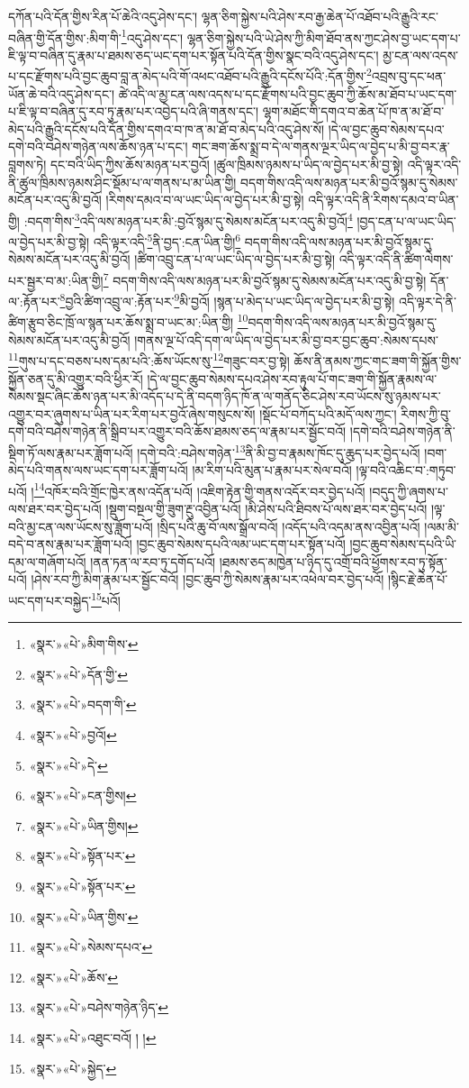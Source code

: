 དཀོན་པའི་དོན་གྱིས་རིན་པོ་ཆེའི་འདུ་ཤེས་དང་། ལྷན་ཅིག་སྐྱེས་པའི་ཤེས་རབ་རྒྱ་ཆེན་པོ་འཐོབ་པའི་རྒྱུའི་རང་བཞིན་གྱི་དོན་གྱིས་:མིག་གི་\footnote{«སྣར་»«པེ་»མིག་གིས་}འདུ་ཤེས་དང་། ལྷན་ཅིག་སྐྱེས་པའི་ཡེ་ཤེས་ཀྱི་མིག་ཐོབ་ནས་ཀྱང་ཤེས་བྱ་ཡང་དག་པ་ཇི་ལྟ་བ་བཞིན་དུ་རྣམ་པ་ཐམས་ཅད་ཡང་དག་པར་སྟོན་པའི་དོན་གྱིས་སྣང་བའི་འདུ་ཤེས་དང་། མྱ་ངན་ལས་འདས་པ་དང་རྫོགས་པའི་བྱང་ཆུབ་བླ་ན་མེད་པའི་གོ་འཕང་འཐོབ་པའི་རྒྱུའི་དངོས་པོའི་:དོན་གྱིས་\footnote{«སྣར་»«པེ་»དོན་གྱི་}འབྲས་བུ་དང་ཕན་ཡོན་ཆེ་བའི་འདུ་ཤེས་དང་། ཚེ་འདི་ལ་མྱ་ངན་ལས་འདས་པ་དང་རྫོགས་པའི་བྱང་ཆུབ་ཀྱི་ཆོས་མ་ཐོབ་པ་ཡང་དག་པ་ཇི་ལྟ་བ་བཞིན་དུ་རབ་ཏུ་རྣམ་པར་འབྱེད་པའི་ཞི་གནས་དང་། ལྷག་མཐོང་གི་དགའ་བ་ཆེན་པོ་ཁ་ན་མ་ཐོ་བ་མེད་པའི་རྒྱུའི་དངོས་པའི་དོན་གྱིས་དགའ་བ་ཁ་ན་མ་ཐོ་བ་མེད་པའི་འདུ་ཤེས་སོ། །དེ་ལ་བྱང་ཆུབ་སེམས་དཔའ་དགེ་བའི་བཤེས་གཉེན་ལས་ཆོས་ཉན་པ་དང་། གང་ཟག་ཆོས་སྨྲ་བ་དེ་ལ་གནས་ལྔར་ཡིད་ལ་བྱེད་པ་མི་བྱ་བར་རྣ་བླགས་ཏེ། དང་བའི་ཡིད་ཀྱིས་ཆོས་མཉན་པར་བྱའོ། །ཚུལ་ཁྲིམས་ཉམས་པ་ཡིད་ལ་བྱེད་པར་མི་བྱ་སྟེ། འདི་ལྟར་འདི་ནི་ཚུལ་ཁྲིམས་ཉམས་ཤིང་སྡོམ་པ་ལ་གནས་པ་མ་ཡིན་གྱི། བདག་གིས་འདི་ལས་མཉན་པར་མི་བྱའོ་སྙམ་དུ་སེམས་མངོན་པར་འདུ་མི་བྱའོ། །རིགས་དམའ་བ་ལ་ཡང་ཡིད་ལ་བྱེད་པར་མི་བྱ་སྟེ། འདི་ལྟར་འདི་ནི་རིགས་དམའ་བ་ཡིན་གྱི། :བདག་གིས་\footnote{«སྣར་»«པེ་»བདག་གི་}འདི་ལས་མཉན་པར་མི་:བྱའོ་སྙམ་དུ་སེམས་མངོན་པར་འདུ་མི་བྱའོ།\footnote{«སྣར་»«པེ་»བྱའོ།} །བྱད་ངན་པ་ལ་ཡང་ཡིད་ལ་བྱེད་པར་མི་བྱ་སྟེ། འདི་ལྟར་འདི་\footnote{«སྣར་»«པེ་»དེ་}ནི་བྱད་:ངན་ཡིན་གྱི།\footnote{«སྣར་»«པེ་»ངན་གྱིས།} བདག་གིས་འདི་ལས་མཉན་པར་མི་བྱའོ་སྙམ་དུ་སེམས་མངོན་པར་འདུ་མི་བྱའོ། །ཚིག་འབྲུ་ངན་པ་ལ་ཡང་ཡིད་ལ་བྱེད་པར་མི་བྱ་སྟེ། འདི་ལྟར་འདི་ནི་ཚིག་ལེགས་པར་སྦྱར་བ་མ་:ཡིན་གྱི།\footnote{«སྣར་»«པེ་»ཡིན་གྱིས།} བདག་གིས་འདི་ལས་མཉན་པར་མི་བྱའོ་སྙམ་དུ་སེམས་མངོན་པར་འདུ་མི་བྱ་སྟེ། དོན་ལ་:རྟོན་པར་\footnote{«སྣར་»«པེ་»སྟོན་པར་}བྱའི་ཚིག་འབྲུ་ལ་:རྟོན་པར་\footnote{«སྣར་»«པེ་»སྟོན་པར་}མི་བྱའོ། །སྙན་པ་མེད་པ་ཡང་ཡིད་ལ་བྱེད་པར་མི་བྱ་སྟེ། འདི་ལྟར་དེ་ནི་ཚིག་རྩུབ་ཅིང་ཁྲོ་ལ་སྙན་པར་ཆོས་སྨྲ་བ་ཡང་མ་:ཡིན་གྱི། \footnote{«སྣར་»«པེ་»ཡིན་གྱིས་}བདག་གིས་འདི་ལས་མཉན་པར་མི་བྱའོ་སྙམ་དུ་སེམས་མངོན་པར་འདུ་མི་བྱའོ། །གནས་ལྔ་པོ་འདི་དག་ལ་ཡིད་ལ་བྱེད་པར་མི་བྱ་བར་བྱང་ཆུབ་:སེམས་དཔས་\footnote{«སྣར་»«པེ་»སེམས་དཔའ་}གུས་པ་དང་བཅས་པས་དམ་པའི་:ཆོས་ཡོངས་སུ་\footnote{«སྣར་»«པེ་»ཆོས་}གཟུང་བར་བྱ་སྟེ། ཆོས་ནི་ནམས་ཀྱང་གང་ཟག་གི་སྐྱོན་གྱིས་སྐྱོན་ཅན་དུ་མི་འགྱུར་བའི་ཕྱིར་རོ། །དེ་ལ་བྱང་ཆུབ་སེམས་དཔའ་ཤེས་རབ་རྟུལ་པོ་གང་ཟག་གི་སྐྱོན་རྣམས་ལ་སེམས་སྡང་ཞིང་ཆོས་ཉན་པར་མི་འདོད་པ་དེ་ནི་བདག་ཉིད་ཁོ་ན་ལ་གནོད་ཅིང་ཤེས་རབ་ཡོངས་སུ་ཉམས་པར་འགྱུར་བར་ཞུགས་པ་ཡིན་པར་རིག་པར་བྱའོ་ཞེས་གསུངས་སོ། །སྡོང་པོ་བཀོད་པའི་མདོ་ལས་ཀྱང་། རིགས་ཀྱི་བུ་དགེ་བའི་བཤེས་གཉེན་ནི་སྒྲིབ་པར་འགྱུར་བའི་ཆོས་ཐམས་ཅད་ལ་རྣམ་པར་སྦྱོང་བའོ། །དགེ་བའི་བཤེས་གཉེན་ནི་སྡིག་ཏོ་ལས་རྣམ་པར་ཟློག་པའོ། །དགེ་བའི་:བཤེས་གཉེན་\footnote{«སྣར་»«པེ་»བཤེས་གཉེན་ཉིད་}ནི་མི་བྱ་བ་རྣམས་ཁོང་དུ་ཆུད་པར་བྱེད་པའོ། །བག་མེད་པའི་གནས་ལས་ཡང་དག་པར་ཟློག་པའོ། །མ་རིག་པའི་མུན་པ་རྣམ་པར་སེལ་བའོ། །ལྟ་བའི་འཆིང་བ་:གཏུབ་པའོ། །\footnote{«སྣར་»«པེ་»འཐུང་བའོ། ། །}འཁོར་བའི་གྲོང་ཁྱེར་ནས་འདོན་པའོ། །འཇིག་རྟེན་གྱི་གནས་འདོར་བར་བྱེད་པའོ། །བདུད་ཀྱི་ཞགས་པ་ལས་ཐར་བར་བྱེད་པའོ། །སྡུག་བསྔལ་གྱི་ཟུག་རྔུ་འབྱིན་པའོ། །མི་ཤེས་པའི་ཐིབས་པོ་ལས་ཐར་བར་བྱེད་པའོ། །ལྟ་བའི་མྱ་ངན་ལས་ཡོངས་སུ་ཟློག་པའོ། །སྲིད་པའི་ཆུ་བོ་ལས་སྒྲོལ་བའོ། །འདོད་པའི་འདམ་ནས་འབྱིན་པའོ། །ལམ་མི་བདེ་བ་ནས་རྣམ་པར་ཟློག་པའོ། །བྱང་ཆུབ་སེམས་དཔའི་ལམ་ཡང་དག་པར་སྟོན་པའོ། །བྱང་ཆུབ་སེམས་དཔའི་ཡི་དམ་ལ་གཞོག་པའོ། །ནན་ཏན་ལ་རབ་ཏུ་དགོད་པའོ། །ཐམས་ཅད་མཁྱེན་པ་ཉིད་དུ་འགྲོ་བའི་ཕྱོགས་རབ་ཏུ་སྟོན་པའོ། །ཤེས་རབ་ཀྱི་མིག་རྣམ་པར་སྦྱོང་བའོ། །བྱང་ཆུབ་ཀྱི་སེམས་རྣམ་པར་འཕེལ་བར་བྱེད་པའོ། །སྙིང་རྗེ་ཆེན་པོ་ཡང་དག་པར་བསྐྱེད་\footnote{«སྣར་»«པེ་»སྐྱེད་}པའོ། 